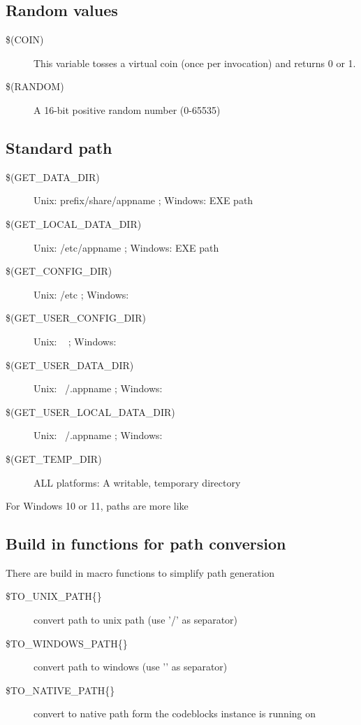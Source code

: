 \subsection{Random values}

\begin{description}
\item[{\footnotesize \$(COIN)}] This variable tosses a virtual coin (once per invocation) and returns 0 or 1.
\item[{\footnotesize \$(RANDOM)}] A 16-bit positive random number (0-65535)
\end{description}

\subsection{Standard path}

\begin{description}
\item[{\footnotesize \$(GET\_DATA\_DIR)}] Unix: prefix/share/appname ; Windows: EXE path
\item[{\footnotesize \$(GET\_LOCAL\_DATA\_DIR)}] Unix: /etc/appname ; Windows: EXE path
\item[{\footnotesize \$(GET\_CONFIG\_DIR)}] Unix: /etc ; Windows: 
\item[{\footnotesize \$(GET\_USER\_CONFIG\_DIR)}] Unix: ~ ; Windows: 
\item[{\footnotesize \$(GET\_USER\_DATA\_DIR)}] Unix: ~/.appname ; Windows: 
\item[{\footnotesize \$(GET\_USER\_LOCAL\_DATA\_DIR)}] Unix: ~/.appname ; Windows: 
\item[{\footnotesize \$(GET\_TEMP\_DIR)}] ALL platforms: A writable, temporary directory
\end{description}
For Windows 10 or 11, paths are more like 


\subsection{Build in functions for path conversion}
There are build in macro functions to simplify path generation 
\begin{description}
\item[{\footnotesize \$TO\_UNIX\_PATH\{\}}] convert path to unix path (use '/' as separator)
\item[{\footnotesize \$TO\_WINDOWS\_PATH\{\}}] convert path to windows (use '\osp' as separator)
\item[{\footnotesize \$TO\_NATIVE\_PATH\{\}}] convert to native path form the codeblocks instance is running on
\end{description}

